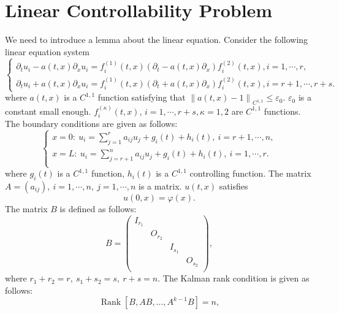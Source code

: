 \documentclass[a4paper,reqno,11pt]{amsart}
\numberwithin{equation}{section} %
\begin{document}
\section{Linear Controllability Problem}
We need to introduce a lemma about the linear equation. Consider the following linear equation system
\begin{equation}\label{e1}
	\left\{\begin{array}{l}
	\partial_t u_i- a(t,x)\partial_x u_i=f^{(1)}_i(t,x)(\partial_t - a(t,x)\partial_x)f^{(2)}_i(t,x), i=1, \cdots, r, \\
	\partial_t u_i+ a(t,x)\partial_x u_i=f^{(1)}_i(t,x)(\partial_t + a(t,x)\partial_x)f^{(2)}_i(t,x), i=r+1, \cdots, r+s.
	\end{array}\right.
\end{equation}
where $a(t,x)$ is a $C^{1,1}$ function satisfying that $\left\lVert a(t,x)-1\right\rVert _{C^{1,1}} \leq \varepsilon _0$. $\varepsilon _0$ is a constant small enough. $f^{(\kappa )}_i(t,x)$, $i=1,\cdots,r+s,\kappa =1,2$ are $C^{1,1}$ functions. The boundary conditions are given as follows:
\begin{equation}\label{e2}
	\left\{ \begin{array}{l}
		x=0:\ u_i=\sum_{j=1}^r{a_{ij}u_j + g_i(t) + h_i\left( t \right) ,\ i=r+1,\cdots ,n,}\\
		x=L:\ u_i=\sum_{j=r+1}^n{a_{ij}u_j +g_i(t) + h_i\left( t \right) ,\ i=1,\cdots ,r.}\\
	\end{array} \right. 
\end{equation}
where $g_i(t)$ is a $C^{1,1}$ function, $h_i(t)$ is a $C^{1,1}$ controlling function. The matrix $A=\left( a_{ij} \right) ,\ i=1,\cdots ,n,\ j=1,\cdots ,n$ is a matrix. $u(t,x)$ satisfies
\begin{equation}\label{4}
	u\left( 0,x \right) =\varphi \left( x \right) .
\end{equation}
The matrix $B$ is defined as follows:
$$
B=\left( \begin{matrix}
	I_{r_1}&		&		&		\\
	&		O_{r_2}&		&		\\
	&		&		I_{s_1}&		\\
	&		&		&		O_{s_2}\\
\end{matrix} \right) ,
$$
where $r_1 +r_2 =r,\ s_1+s_2=s,\ r+s=n $. The Kalman rank condition is given as follows:
\begin{equation}\label{kalman}
	\operatorname{Rank}\left[B, AB, \ldots, A^{k-1} B\right]=n,
\end{equation}
\end{document}
